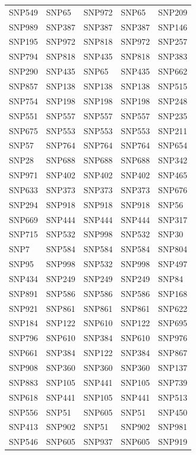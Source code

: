 \begin{table}[ht]
\begin{tabular}{lllll}
  SNP549 & SNP65 & SNP972 & SNP65 & SNP209 \\ 
  SNP989 & SNP387 & SNP387 & SNP387 & SNP146 \\ 
  SNP195 & SNP972 & SNP818 & SNP972 & SNP257 \\ 
  SNP794 & SNP818 & SNP435 & SNP818 & SNP383 \\ 
  SNP290 & SNP435 & SNP65 & SNP435 & SNP662 \\ 
  SNP857 & SNP138 & SNP138 & SNP138 & SNP515 \\ 
  SNP754 & SNP198 & SNP198 & SNP198 & SNP248 \\ 
  SNP551 & SNP557 & SNP557 & SNP557 & SNP235 \\ 
  SNP675 & SNP553 & SNP553 & SNP553 & SNP211 \\ 
  SNP57 & SNP764 & SNP764 & SNP764 & SNP654 \\ 
  SNP28 & SNP688 & SNP688 & SNP688 & SNP342 \\ 
  SNP971 & SNP402 & SNP402 & SNP402 & SNP465 \\ 
  SNP633 & SNP373 & SNP373 & SNP373 & SNP676 \\ 
  SNP294 & SNP918 & SNP918 & SNP918 & SNP56 \\ 
  SNP669 & SNP444 & SNP444 & SNP444 & SNP317 \\ 
  SNP715 & SNP532 & SNP998 & SNP532 & SNP30 \\ 
  SNP7 & SNP584 & SNP584 & SNP584 & SNP804 \\ 
  SNP95 & SNP998 & SNP532 & SNP998 & SNP497 \\ 
  SNP434 & SNP249 & SNP249 & SNP249 & SNP84 \\ 
  SNP891 & SNP586 & SNP586 & SNP586 & SNP168 \\ 
  SNP921 & SNP861 & SNP861 & SNP861 & SNP622 \\ 
  SNP184 & SNP122 & SNP610 & SNP122 & SNP695 \\ 
  SNP796 & SNP610 & SNP384 & SNP610 & SNP976 \\ 
  SNP661 & SNP384 & SNP122 & SNP384 & SNP867 \\ 
  SNP908 & SNP360 & SNP360 & SNP360 & SNP137 \\ 
  SNP883 & SNP105 & SNP441 & SNP105 & SNP739 \\ 
  SNP618 & SNP441 & SNP105 & SNP441 & SNP513 \\ 
  SNP556 & SNP51 & SNP605 & SNP51 & SNP450 \\ 
  SNP413 & SNP902 & SNP51 & SNP902 & SNP981 \\ 
  SNP546 & SNP605 & SNP937 & SNP605 & SNP919 \\ 

\end{tabular}
\end{table}
